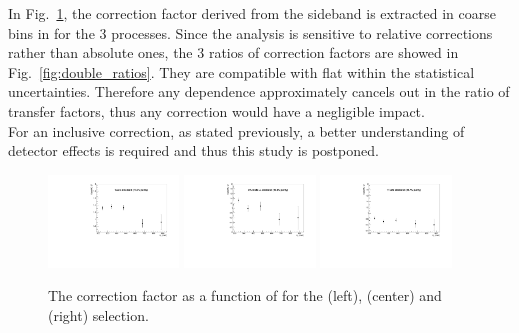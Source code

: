 In Fig.~\ref{fig:sfVsHt}, the correction factor derived from the \mhtmet sideband is extracted in coarse bins in \scalht for the 3 processes. 
Since the analysis is sensitive to relative corrections rather than absolute ones, the 3 ratios of correction factors 
are showed in Fig.~\ref{fig:double_ratios}. They are compatible with flat within the statistical uncertainties. 
Therefore any \scalht dependence approximately cancels out in the ratio of transfer factors, thus any correction would have a negligible impact. \\
For an inclusive correction, as stated previously, a better understanding of detector effects is required and thus this study is postponed. 

\begin{figure}[!h]
  \centering
  \includegraphics[width=0.31\textwidth]{figures/sidebandCorr/SFvsHT_MHTOverMET_WJets}
  \includegraphics[width=0.31\textwidth]{figures/sidebandCorr/SFvsHT_MHTOverMET_DYJetsToLL}
  \includegraphics[width=0.31\textwidth]{figures/sidebandCorr/SFvsHT_MHTOverMET_TTJets}
  \caption{The correction factor as a function of \scalht for the \wj (left), \zj (center) and \ttj (right) selection.}
  \label{fig:sfVsHt}
\end{figure}

